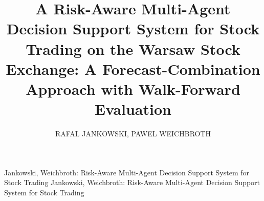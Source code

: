 \documentclass{ieeeaccess}
\begin{document}

\title{A Risk-Aware Multi-Agent Decision Support System for Stock Trading on the Warsaw Stock Exchange: A Forecast-Combination Approach with Walk-Forward Evaluation}

\author{\uppercase{Rafal Jankowski},
\uppercase{Pawel Weichbroth}}

\address[1]{Faculty of Electronics, Telecommunications, and Informatics, Gdańsk University of Technology, 80-233 Gdańsk, Poland}
\address[2]{Faculty of Electronics, Telecommunications, and Informatics, Gdańsk University of Technology, 80-233 Gdańsk, Poland}


\markboth
{Jankowski, Weichbroth: Risk-Aware Multi-Agent Decision Support System for Stock Trading}
{Jankowski, Weichbroth: Risk-Aware Multi-Agent Decision Support System for Stock Trading}

\end{document}
